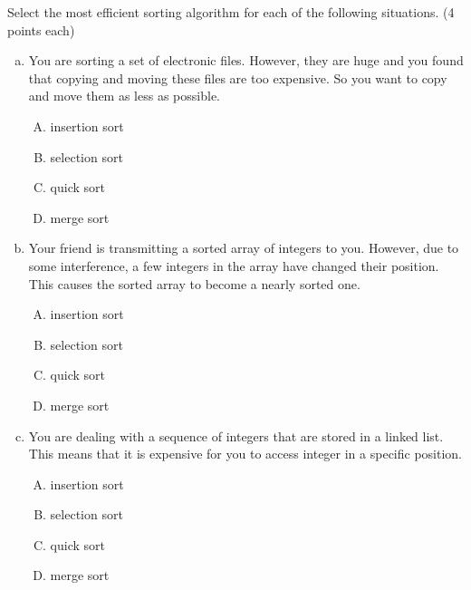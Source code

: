 \documentclass[11pt]{exam}
\begin{document}
Select the most efficient sorting algorithm for each of the following situations. (4 points each)
\begin{enumerate}[(a)]
    \item You are sorting a set of electronic files. However, they are huge and you found that copying and moving these files are too expensive. So you want to copy and move them as less as possible.
          \begin{enumerate}[A)]
              \item insertion sort
              \item selection sort
              \item quick sort
              \item merge sort
          \end{enumerate}
          \begin{solution}

          \end{solution}

    \item Your friend is transmitting a sorted array of integers to you. However, due to some interference, a few integers in the array have changed their position. This causes the sorted array to become a nearly sorted one.
          \begin{enumerate}[A)]
              \item insertion sort
              \item selection sort
              \item quick sort
              \item merge sort
          \end{enumerate}
          \begin{solution}

          \end{solution}

    \item You are dealing with a sequence of integers that are stored in a linked list. This means that it is expensive for you to access integer in a specific position.
          \begin{enumerate}[A)]
              \item insertion sort
              \item selection sort
              \item quick sort
              \item merge sort
          \end{enumerate}
          \begin{solution}


\end{solution}
\end{enumerate}
\end{document}
